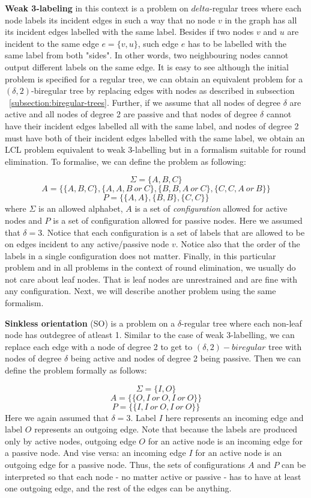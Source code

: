 \textbf{Weak 3-labeling} in this context is a problem on $delta$-regular trees where
each node labels its incident edges in such a way that no node $v$ in the graph
has all its incident edges labelled with the same label. Besides if two
nodes $v$ and $u$ are incident to the same edge $e = \{v, u\}$, such
edge $e$ has to be labelled with the same label from both "sides". In other words,
two neighbouring nodes cannot output different labels on the same edge.
It is easy to see although the initial problem is specified for a regular
tree, we can obtain an equivalent problem for a $(\delta, 2)$-biregular tree
by replacing edges with nodes as described in subsection ~\ref{subsection:biregular-trees}.
Further, if we assume that all nodes of degree $\delta$ are active and all nodes of 
degree 2 are passive and that nodes of degree $\delta$ cannot have their incident
edges labelled all with the same label, and nodes of degree 2 must have both of their
incident edges labelled with the same label, we obtain an LCL problem equivalent to
weak 3-labelling but in a formalism suitable for round elimination. To formalise, we
can define the problem as following:

$$\Sigma = \{A, B, C\}$$
$$A = \{ \{A, B, C\}, \{A, A, B~or~C\}, \{B, B, A~or~C\}, \{C, C, A~or~B\} \}$$
$$P = \{ \{A, A\}, \{B, B\}, \{C, C\}\}$$
where $\Sigma$ is an allowed alphabet, $A$ is a set of \emph{configuration}
allowed for active nodes and $P$ is a set of configuration allowed for
passive nodes. Here we assumed that $\delta = 3$. Notice that each
configuration is a set of labels that are allowed to be on edges 
incident to any active/passive node $v$. Notice also that the order of
the labels in a single configuration does not matter. Finally, in this particular problem
and in all problems in the context of round elimination, we usually do not care about
leaf nodes. That is leaf nodes are unrestrained and are fine with any 
configuration.  Next, we will
describe another problem using the same formalism.

\textbf{Sinkless orientation} (SO) is a problem on a $\delta$-regular tree
where each non-leaf node has outdegree of atleast 1. Similar to the case of weak 3-labelling,
we can replace each edge with a node of degree 2 to get to $(\delta, 2)-biregular$ tree with
nodes of degree $\delta$ being active and nodes of degree 2 being passive.
Then we can define the problem formally as follows:

$$\Sigma = \{I, O\}$$
$$A = \{ \{O, I~or~O, I~or~O\} \}$$
$$P = \{ \{I, I~or~O, I~or~O\}\}$$
Here we again assumed that $\delta = 3$. Label $I$ here represents
an incoming edge and label $O$ represents an outgoing edge.
Note that because the labels are produced only by active nodes,
outgoing edge $O$ for an active node is an incoming edge for a 
passive node. And vise versa: an incoming edge $I$ for an active node
is an outgoing edge for a passive node. Thus, the sets of configurations
$A$ and $P$ can be interpreted so that each node - no matter active or passive -
has to have at least one outgoing edge, and the rest of the edges can be anything.

